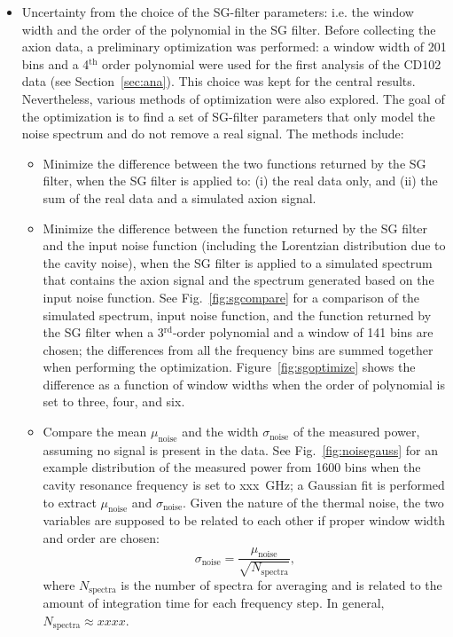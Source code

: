 \begin{itemize}
\item Uncertainty from the choice of the SG-filter parameters: i.e.  
the window width and the order of the polynomial in the SG filter. Before 
collecting the axion data, a preliminary optimization was performed: a 
window width of 201 bins and a 4$^\text{th}$ order polynomial were used for 
the first analysis of the CD102 data (see Section~\ref{sec:ana}). 
This choice was kept for the central results. 
Nevertheless, various methods of optimization were also explored. The goal 
of the optimization is to find a set of SG-filter parameters that only 
model the noise spectrum and do not remove a real signal. 
The methods include:
\begin{itemize}
 \item Minimize the difference between the two functions returned by the SG 
filter, when the SG filter is applied to: (i) the real data only, and (ii) 
the sum of the real data and a simulated axion signal. 
 \item Minimize the difference between the function returned by the 
 SG filter and the input noise function (including the Lorentzian distribution 
due to the cavity noise), when the SG filter is applied to
a simulated spectrum that contains the axion signal and the spectrum 
generated based on the input noise function. See Fig.~\ref{fig:sgcompare} 
for a comparison of  the simulated spectrum, input noise function, and the 
function returned by 
 the SG filter when a 3$^\text{rd}$-order polynomial and a window of 141 
 bins are chosen; the differences from all the frequency bins are summed 
 together when performing the optimization.
 Figure~\ref{fig:sgoptimize} shows the difference 
as a function of window widths when the order of polynomial is 
 set to three, four, and six. 
 \item Compare the mean $\mu_\text{noise}$ and the width $\sigma_\text{noise}$ 
of the measured power, assuming no signal is present in the 
data. See Fig.~\ref{fig:noisegauss} for an example distribution 
of the measured power from 1600 bins when the cavity resonance frequency 
is set to xxx~GHz; a Gaussian fit is performed to extract $\mu_\text{noise}$ 
and $\sigma_\text{noise}$. Given the nature of the 
thermal noise, the two variables are supposed to be related to 
each other if proper window width and order are chosen:
\begin{equation*} 
\sigma_\text{noise} = \frac{\mu_\text{noise}}{\sqrt{N_\text{spectra}}},
\end{equation*}
where $N_\text{spectra}$ is the number of spectra for averaging and 
is related to the amount of integration time for each frequency step. In 
general, $N_\text{spectra}\approx xxxx$. 
\end{itemize}


\end{itemize}
